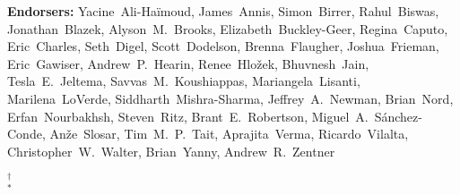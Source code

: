 \begin{raggedright}
\textbf{Endorsers:}
Yacine~Ali-Ha\"imoud,
James~Annis,
Simon~Birrer,
Rahul~Biswas,
Jonathan~Blazek,
Alyson~M.~Brooks,
Elizabeth~Buckley-Geer,
Regina~Caputo,
Eric~Charles,
Seth~Digel,
Scott~Dodelson,
Brenna~Flaugher,
Joshua~Frieman,
Eric~Gawiser,
Andrew~P.~Hearin,
Renee~Hlo\v{z}ek,
Bhuvnesh~Jain,
Tesla~E.~Jeltema,
Savvas~M.~Koushiappas,
Mariangela~Lisanti,
Marilena~LoVerde,
Siddharth~Mishra-Sharma,
Jeffrey~A.~Newman,
Brian~Nord,
Erfan~Nourbakhsh,
Steven~Ritz,
Brant~E.~Robertson,
Miguel~A.~S\'anchez-Conde,
An\v{z}e~Slosar,
Tim~M.~P.~Tait,
Aprajita~Verma,
Ricardo~Vilalta,
Christopher~W.~Walter,
Brian~Yanny,
Andrew~R.~Zentner


$^\dagger$  \\
$^*$ 

\begin{multicols}{2}
\scriptsize
\parskip=4pt



\end{multicols}
\end{raggedright}
